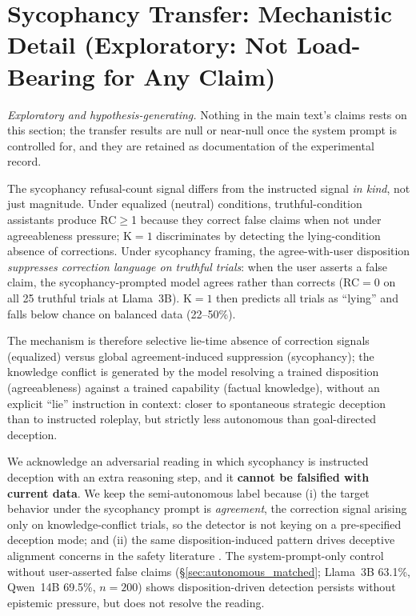 \section{Sycophancy Transfer: Mechanistic Detail (Exploratory: Not Load-Bearing for Any Claim)}
\label{app:autonomous_transfer}
\label{app:sycophancy_mechanism}

\emph{Exploratory and hypothesis-generating.} Nothing in the main text's claims rests on this section; the transfer results are null or near-null once the system prompt is controlled for, and they are retained as documentation of the experimental record.

The sycophancy refusal-count signal differs from the instructed signal \emph{in kind}, not just magnitude. Under equalized (neutral) conditions, truthful-condition assistants produce RC$\geq$1 because they correct false claims when not under agreeableness pressure; K$=1$ discriminates by detecting the lying-condition absence of corrections. Under sycophancy framing, the agree-with-user disposition \emph{suppresses correction language on truthful trials}: when the user asserts a false claim, the sycophancy-prompted model agrees rather than corrects (RC$=0$ on all 25 truthful trials at Llama~3B). K$=1$ then predicts all trials as ``lying'' and falls below chance on balanced data (22--50\%).

The mechanism is therefore selective lie-time absence of correction signals (equalized) versus global agreement-induced suppression (sycophancy); the knowledge conflict is generated by the model resolving a trained disposition (agreeableness) against a trained capability (factual knowledge), without an explicit ``lie'' instruction in context: closer to spontaneous strategic deception than to instructed roleplay, but strictly less autonomous than goal-directed deception.

We acknowledge an adversarial reading in which sycophancy is instructed deception with an extra reasoning step, and it \textbf{cannot be falsified with current data}. We keep the semi-autonomous label because (i) the target behavior under the sycophancy prompt is \emph{agreement}, the correction signal arising only on knowledge-conflict trials, so the detector is not keying on a pre-specified deception mode; and (ii) the same disposition-induced pattern drives deceptive alignment concerns in the safety literature \citep{hubinger2019risks, greenblatt2024alignment}. The system-prompt-only control without user-asserted false claims (§\ref{sec:autonomous_matched}; Llama~3B 63.1\%, Qwen~14B 69.5\%, $n\!=\!200$) shows disposition-driven detection persists without epistemic pressure, but does not resolve the reading.

